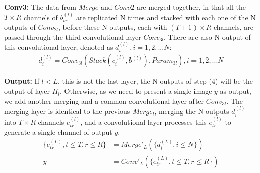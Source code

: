 \vspace{1mm}
\noindent
\textbf{Conv3:} The data from $Merge$ and $Conv2$ are merged together, in that all the $T\times R$ channels of $b_{tr}^{(l)}$ are replicated N times and stacked with each one of the N outputs of $Conv_{2l}$, before these N outputs, each with $(T+1)\times R$ channels, are passed through the third convolutional layer $Conv_{3l}$. There are also N output of this convolutional layer, denoted as $d_i^{(l)}, i=1,2,...N$:
\begin{equation}\label{eq:8}
    \begin{split}
        d_i^{(l)} = Conv_{3l}(Stack(c_i^{(l)},b^{(l)}),Param_{3l}), i=1,2,...N 
\end{split}
\end{equation}

\vspace{1mm}
\noindent
\textbf{Output:} If $l < L$, this is not the last layer, the N outputs of step (4) will be the output of layer $H_l$. Otherwise, as we need to present a single image $y$ as output, we add another merging and a common convolutional layer after $Conv_{3l}$. The merging layer is identical to the previous $Merge_l$, merging the N outputs $d_i^{(l)}$ into $T\times R$ channels $e_{tr}^{(l)}$, and a convolutional layer processes this $e_{tr}^{(l)}$ to generate a single channel of output $y$. 
\begin{equation}\label{eq:7}
    \begin{split}
        \{e_{tr}^{(L)},t\le T,r\le R\} &= Merge'_{L}(\{d_i^{(L)},i\le N\})\\
        y &= Conv'_{L}(\{e_{tr}^{(L)},t\le T,r\le R\} )\\
\end{split}
\end{equation}



